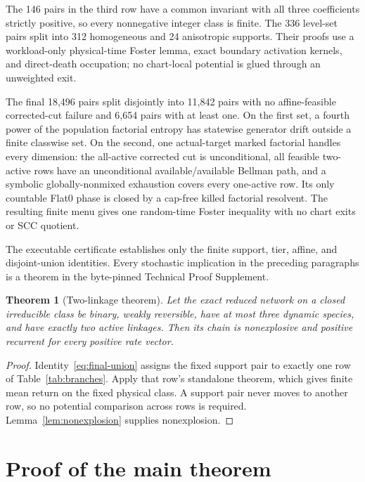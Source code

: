 \documentclass[11pt]{article}
\newtheorem{theorem}{Theorem}[section]
\theoremstyle{definition}
\theoremstyle{remark}
\newcommand{\1}{\mathbf 1}
\begin{document}
The 146 pairs in the third row have a common invariant with all three
coefficients strictly positive, so every nonnegative integer class is
finite.  The 336 level-set pairs split into 312 homogeneous and 24
anisotropic supports.  Their proofs use a workload-only physical-time Foster
lemma, exact boundary activation kernels, and direct-death occupation; no
chart-local potential is glued through an unweighted exit.

The final 18,496 pairs split disjointly into 11,842 pairs with no
affine-feasible corrected-cut failure and 6,654 pairs with at least one.  On
the first set, a fourth power of the population factorial entropy has
statewise generator drift outside a finite classwise set.  On the second,
one actual-target marked factorial handles every dimension: the all-active
corrected cut is unconditional, all feasible two-active rows have an
unconditional available/available Bellman path, and a symbolic
globally-nonmixed exhaustion covers every one-active row.  Its only
countable Flat0 phase is closed by a cap-free killed factorial resolvent.
The resulting finite menu gives one random-time Foster inequality with no
chart exits or SCC quotient.

The executable certificate establishes only the finite support, tier,
affine, and disjoint-union identities.  Every stochastic implication in the
preceding paragraphs is a theorem in the byte-pinned Technical Proof
Supplement.

\begin{theorem}[Two-linkage theorem]\label{thm:two-link}
Let the exact reduced network on a closed irreducible class be binary, weakly
reversible, have at most three dynamic species, and have exactly two active
linkages.  Then its chain is nonexplosive and positive recurrent for every
positive rate vector.
\end{theorem}

\begin{proof}
Identity~\eqref{eq:final-union} assigns the fixed support pair to exactly one
row of Table~\ref{tab:branches}.  Apply that row's standalone theorem, which
gives finite mean return on the fixed physical class.  A support pair never
moves to another row, so no potential comparison across rows is required.
Lemma~\ref{lem:nonexplosion} supplies nonexplosion.
\end{proof}

\section{Proof of the main theorem}
\end{document}
